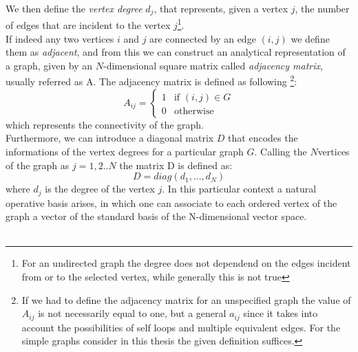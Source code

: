 \noindent
We then define the \textit{vertex degree} $d_j$, that represents, given a vertex $j$, the number of edges that are incident to the vertex $j$\footnote{For an undirected graph the degree does not dependend on the edges incident from or to the selected vertex, while generally this is not true}. \\

\noindent
If indeed any two vertices $i$ and $j$ are connected by an edge $(i,j)$ we define them as \textit{adjacent}, and from this we can construct an analytical representation of a graph, given by an $N$-dimensional square matrix called \textit{adjacency matrix}, usually referred as A. The adjacency matrix is defined as following \footnote{If we had to define the adjacency matrix for an unspecified graph the value of $A_{ij}$ is not necessarily equal to one, but a general $a_{ij}$ since it takes into account the possibilities of self loops and multiple equivalent edges. For the simple graphs consider in this thesis the given definition suffices.}:
\begin{equation}
A_{ij} = \begin{cases} 1 & \mbox{if }(i,j)\in G \\ 0 & \mbox{otherwise} \end{cases}
\end{equation}
which represents the connectivity of the graph. \\
Furthermore, we can introduce a diagonal matrix $D$ that encodes the informations of the vertex degrees for a particular graph $G$. Calling the $N$vertices of the graph as $j=1,2..N$ the matrix D is defined as:
\begin{equation}
    D = diag(d_1,..., d_N)
\end{equation}
where $d_j$ is the degree of the vertex $j$.
In this particular context a natural operative basis arises, in which one can associate to each ordered vertex of the graph a vector of the standard basis of the N-dimensional vector space. \\ \\


